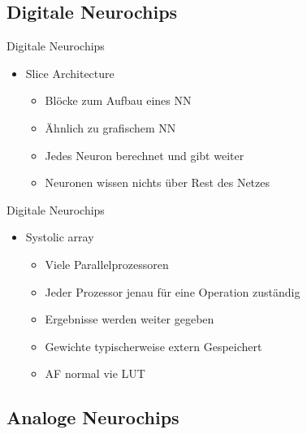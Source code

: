 \documentclass[handout]{beamer}
\begin{document}
    \subsection{Digitale Neurochips}
    \begin{frame} {Digitale Neurochips}
        \begin{itemize}
            \item Slice Architecture
            \begin{itemize}
                \item Blöcke zum Aufbau eines NN
                \item Ähnlich zu grafischem NN
                \item Jedes Neuron berechnet und gibt weiter
                \item Neuronen wissen nichts über Rest des Netzes
            \end{itemize}
        \end{itemize}
    \end{frame}

    \begin{frame} {Digitale Neurochips}
        \begin{itemize}
            \item Systolic array
            \begin{itemize}
                \item Viele Parallelprozessoren
                \item Jeder Prozessor jenau für eine Operation zuständig
                \item Ergebnisse werden weiter gegeben
                \item Gewichte typischerweise extern Gespeichert
                \item AF normal vie LUT
            \end{itemize}
        \end{itemize}
    \end{frame}

    \subsection{Analoge Neurochips}
\end{document}
